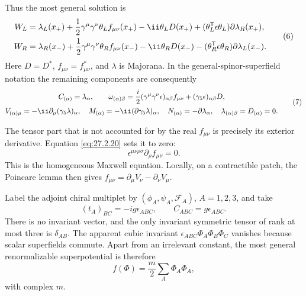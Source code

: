 \begin{enumerate}
  Thus the most general solution is
  \[
  \begin{aligned}
    W_L={}&\lambda_L(x_+)
      +\frac12\gamma^\mu\gamma^\nu\theta_L f_{\mu\nu}(x_+)
      -\ii\theta_LD(x_+)
      +(\theta_L^{\mathsf T}\epsilon\theta_L)
         \sl{\partial}\lambda_R(x_+),\\
    W_R={}&\lambda_R(x_-)
      +\frac12\gamma^\mu\gamma^\nu\theta_R f_{\mu\nu}(x_-)
      -\ii\theta_RD(x_-)
      -(\theta_R^{\mathsf T}\epsilon\theta_R)
         \sl{\partial}\lambda_L(x_-).
  \end{aligned}
    \tag{6}
  \]
  Here \(D=D^*\), \(f_{\mu\nu}=f_{\mu\nu}^*\), and
  \(\lambda\) is Majorana.  In the general-spinor-superfield notation the
  remaining components are consequently
  \[
  \begin{gathered}
    C_{(\alpha)}=\lambda_\alpha,\qquad
    \omega_{(\alpha)\beta}
      =\frac i2(\gamma^\mu\gamma^\nu\epsilon)_{\alpha\beta}f_{\mu\nu}
       +(\gamma_5\epsilon)_{\alpha\beta}D,\\
    V_{(\alpha)\mu}=-\ii\partial_\mu(\gamma_5\lambda)_\alpha,\quad
    M_{(\alpha)}=-\ii(\sl{\partial}\gamma_5\lambda)_\alpha,\quad
    N_{(\alpha)}=-\sl{\partial}\lambda_\alpha,\quad
    \lambda_{(\alpha)\beta}=D_{(\alpha)}=0 .
  \end{gathered}
    \tag{7}
  \]

  The tensor part that is not accounted for by the real
  \(f_{\mu\nu}\) is precisely its exterior derivative.  Equation
  \eqref{eq:27.2.20} sets it to zero:
  \[
    \epsilon^{\mu\nu\rho\sigma}\partial_\rho f_{\mu\nu}=0.
    \tag{8}
  \]
  This is the homogeneous Maxwell equation.  Locally, on a contractible
  patch, the Poincare lemma then gives
  \(f_{\mu\nu}=\partial_\mu V_\nu-\partial_\nu V_\mu\).

  Label the adjoint chiral multiplet by
  \((\phi_A,\psi_A,\mathcal F_A)\), \(A=1,2,3\), and take
  \[
    (t_A)_{BC}=-ig\epsilon_{ABC},\qquad
    C_{ABC}=g\epsilon_{ABC}.
  \]
  There is no invariant vector, and the only invariant symmetric tensor of
  rank at most three is \(\delta_{AB}\).  The apparent cubic invariant
  \(\epsilon_{ABC}\Phi_A\Phi_B\Phi_C\) vanishes because scalar
  superfields commute.  Apart from an irrelevant constant, the most general
  renormalizable superpotential is therefore
  \[
    f(\Phi)=\frac m2\sum_A\Phi_A\Phi_A ,
    \tag{9}
  \]
  with complex \(m\).


\end{enumerate}
